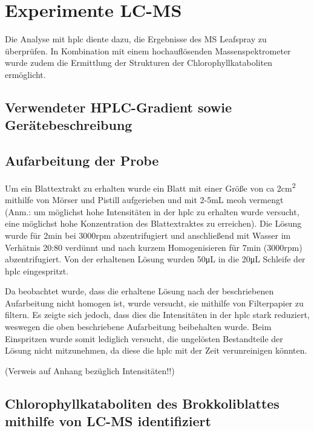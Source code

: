 \chapter{Experimente LC-MS} 

Die Analyse mit \gls{hplc} diente dazu, die Ergebnisse des MS Leafspray zu überprüfen. In Kombination mit einem hochauflösenden Massenspektrometer wurde zudem die Ermittlung der Strukturen der Chlorophyllkataboliten ermöglicht. \\

\section{Verwendeter HPLC-Gradient sowie Gerätebeschreibung}

\section{Aufarbeitung der Probe} \label{sec:HPLCAufarbeitungderProbe}

Um ein Blattextrakt zu erhalten wurde ein Blatt mit einer Größe von \gls{ca} 2\si{cm^{2}} mithilfe von Mörser und Pistill aufgerieben und mit 2-5mL \gls{meoh} vermengt (Anm.: um möglichst hohe Intensitäten in der \gls{hplc} zu erhalten wurde versucht, eine möglichst hohe Konzentration des Blattextraktes zu erreichen). Die Lösung wurde für 2min bei 3000rpm abzentrifugiert und anschließend mit Wasser im Verhätnis 20:80 verdünnt und nach kurzem Homogenisieren für 7min (3000rpm) abzentrifugiert. Von der erhaltenen Lösung wurden 50\si{\uL} in die 20\si{\uL} Schleife der \gls{hplc} eingespritzt. 

Da beobachtet wurde, dass die erhaltene Lösung nach der beschriebenen Aufarbeitung nicht homogen ist, wurde versucht, sie mithilfe von Filterpapier zu filtern. Es zeigte sich jedoch, dass dies die Intensitäten in der \gls{hplc} stark reduziert, weswegen die oben beschriebene Aufarbeitung beibehalten wurde. Beim Einspritzen wurde somit lediglich versucht, die ungelösten Bestandteile der Lösung nicht mitzunehmen, da diese die \gls{hplc} mit der Zeit verunreinigen könnten.

(Verweis auf Anhang bezüglich Intensitäten!!)

\section{Chlorophyllkataboliten des Brokkoliblattes mithilfe von LC-MS identifiziert}

